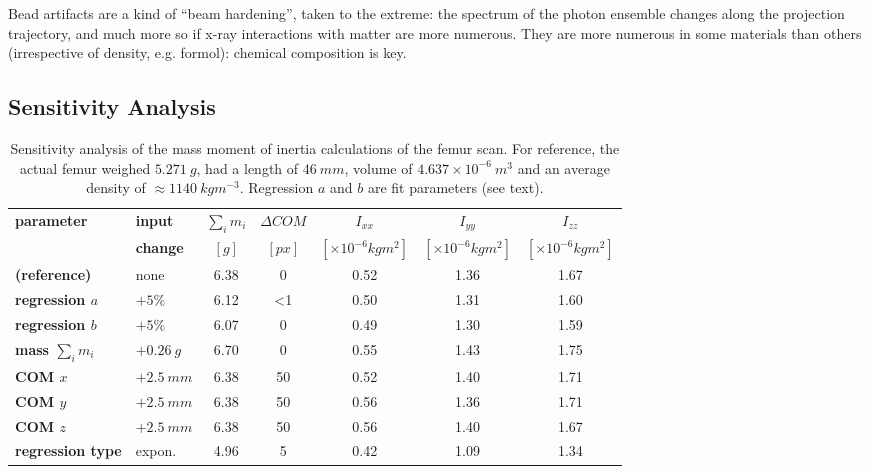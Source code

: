 Bead artifacts are a kind of ``beam hardening'', taken to the extreme: the spectrum of the photon ensemble changes along the projection trajectory, and much more so if x-ray interactions with matter are more numerous.
They are more numerous in some materials than others (irrespective of density, e.g. formol): chemical composition is key.


\subsection{Sensitivity Analysis}
\label{sec:orga003766}

\begin{table}[p]
\caption{\label{tab:sensitivity}Sensitivity analysis of the mass moment of inertia calculations of the femur scan. For reference, the actual femur weighed \(5.271\ g\), had a length of \(46\ mm\), volume of \(4.637\times 10^{-6}\ m^{3}\) and an average density of \(\approx 1140\ kg m^{-3}\). Regression \(a\) and \(b\) are fit parameters (see text).}
\centering
\begin{tabular}{|l|l|c|c|c|c|c|}
\hline
\textbf{parameter} & \textbf{input} & \textbf{\(\sum_{i}m_{i}\)} & \textbf{\(\Delta COM\)} & \textbf{\(I_{xx}\)} & \textbf{\(I_{yy}\)} & \textbf{\(I_{zz}\)}\\[0pt]
 & \textbf{change} & \([g]\) & \([px]\) & \([\times 10^{-6} kg m^2]\) & \([\times 10^{-6} kg m^2]\) & \([\times 10^{-6} kg m^2]\)\\[0pt]
\hline
\hline
\textbf{(reference)} & none & 6.38 & 0 & 0.52 & 1.36 & 1.67\\[0pt]
\hline
\textbf{regression \(a\)} & \(+5 \%\) & 6.12 & <1 & 0.50 & 1.31 & 1.60\\[0pt]
\textbf{regression \(b\)} & \(+5 \%\) & 6.07 & 0 & 0.49 & 1.30 & 1.59\\[0pt]
\hline
\textbf{mass \(\sum_{i} m_{i}\)} & \(+0.26\ g\) & 6.70 & 0 & 0.55 & 1.43 & 1.75\\[0pt]
\hline
\textbf{COM \(x\)} & \(+2.5\ mm\) & 6.38 & 50 & 0.52 & 1.40 & 1.71\\[0pt]
\textbf{COM \(y\)} & \(+2.5\ mm\) & 6.38 & 50 & 0.56 & 1.36 & 1.71\\[0pt]
\textbf{COM \(z\)} & \(+2.5\ mm\) & 6.38 & 50 & 0.56 & 1.40 & 1.67\\[0pt]
\hline
\textbf{regression type} & expon. & 4.96 & 5 & 0.42 & 1.09 & 1.34\\[0pt]
\hline
\hline
\end{tabular}
\end{table}


